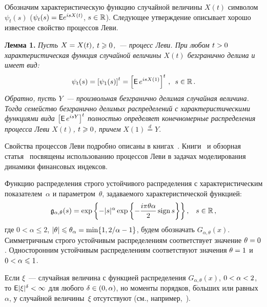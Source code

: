 \begin{multicols}{2}
\smallskip

Обозначим характеристическую функцию случайной величины $X(t)$
символом $\psi_t(s)$ ($\psi_t(s)\hm={\sf E}e^{isX(t)}$,
$s\hm\in\mathbb{R}$). Следующее утверждение описывает хорошо известное
свойство процессов Леви.

\smallskip

\noindent
\textbf{Лемма 1.} \textit{Пусть $X\hm=X(t)$, $t\hm\geqslant 0$,~--- процесс Леви. При
любом $t\hm>0$ характеристическая функция случайной величины $X(t)$
безгранично делима и имеет вид:
\begin{equation}
\psi_{t}(s) = \left[\psi_{1}(s)\right]^{t} = \left[{\sf
E}\,e^{isX(1)}\right]^t\,,\enskip  s\in\mathbb{R}\,.\label{e2-zaks}
\end{equation}
Обратно, пусть $Y$~--- произвольная  безгранично  делимая случайная
величина. Тогда семейство   безгранично   делимых распределений с
характеристическими функциями вида $\left[{\sf E}\,e^{isY}\right]^t$
полностью определяет конечномерные распределения процесса Леви
$X(t)$, $t\hm\geqslant 0$, причем} $X(1)\stackrel{d}{=}Y$.

\smallskip

Свойства процессов Леви подробно описаны в книгах~\cite{Bertoin1996, Sato1999}.
Книги~\cite{BarndorffNielsenMikoschResnick2001, Schoutens2003} и обзорная
статья~\cite{Geman2002} посвящены
использованию процессов Леви в задачах моделирования динамики финансовых индексов.

Функцию распределения строго устойчивого распределения с
характеристическим показателем~$\alpha$ и параметром~$\theta$,
задаваемого характеристической функцией:
$$
\mathfrak{g}_{\alpha,\theta}(s)=\exp
\left\{-|s|^{\alpha}\exp\left\{-\displaystyle\frac{\displaystyle i\pi\theta\alpha\mathstrut}{\displaystyle 2\mathstrut}\,\mathrm{sign}\,s\right\}\right\},\
\enskip s\in\mathbb{R}\,,
$$
где $0<\alpha\leqslant2$,
$|\theta|\leqslant\theta_{\alpha}\hm=\min\{1,{2}/{\alpha}-1\}$, будем
обозначать $G_{\alpha,\theta}(x)$. Сим\-мет\-рич\-ным строго устойчивым
распределениям соответствует значение $\theta\hm=0$. Односторонним
устойчивым распределениям соответствуют значения $\theta\hm=1$ и
$0\hm<\alpha\hm\leqslant1$.

Если $\xi$~--- случайная величина с функцией распределения
$G_{\alpha,\theta}(x)$, $0\hm<\alpha\hm<2$, то ${\sf
E}|\xi|^{\delta}\hm<\infty$ для любого $\delta\hm\in(0,\alpha)$, но
моменты порядков, б$\acute{\mbox{о}}$льших или равных~$\alpha$, у случайной
величины~$\xi$ отсутствуют (см., например,~\cite{Zolotarev1983}).


\end{multicols}
